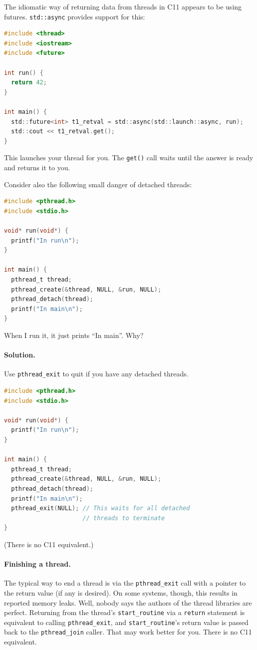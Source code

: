 \documentclass[a4paper]{report}
\newcommand{\CPP}{C\nolinebreak\hspace{-.05em}\raisebox{.4ex}{\tiny\bf +}\nolinebreak\hspace{-.10em}\raisebox{.4ex}{\tiny\bf +}}
\def\CPP{{C\nolinebreak[4]\hspace{-.05em}\raisebox{.4ex}{\tiny\bf ++}}}
\begin{document}
  The idiomatic way of returning data from threads in \CPP11 appears to be using
  futures. {\tt std::async} provides support for this:
\begin{lstlisting}[language=C]
#include <thread>
#include <iostream>
#include <future>

int run() {
  return 42;
}

int main() {
  std::future<int> t1_retval = std::async(std::launch::async, run);
  std::cout << t1_retval.get();
}
\end{lstlisting}
This launches your thread for you. The {\tt get()} call waits until the answer
is ready and returns it to you.

Consider also the following small danger of detached threads:

\begin{lstlisting}[language=C]
#include <pthread.h>
#include <stdio.h>

void* run(void*) {
  printf("In run\n");
}

int main() {
  pthread_t thread;
  pthread_create(&thread, NULL, &run, NULL);
  pthread_detach(thread);
  printf("In main\n");
}
\end{lstlisting}

  When I run it, it just prints ``In main''. Why?

\paragraph{Solution.} Use {\tt pthread\_exit} to quit if you have any detached threads.
  \begin{lstlisting}[language=C]
#include <pthread.h>
#include <stdio.h>

void* run(void*) {
  printf("In run\n");
}

int main() {
  pthread_t thread;
  pthread_create(&thread, NULL, &run, NULL);
  pthread_detach(thread);
  printf("In main\n");
  pthread_exit(NULL); // This waits for all detached
                      // threads to terminate
}
  \end{lstlisting}
(There is no \CPP11 equivalent.)

\paragraph{Finishing a thread.} The typical way to end a thread is via the \texttt{pthread\_exit} call with a pointer to the return value (if any is desired). On some systems, though, this results in reported memory leaks. Well, nobody says the authors of the thread libraries are perfect. Returning from the thread's {\tt start\_routine} via a \texttt{return} statement is equivalent to calling {\tt pthread\_exit}, and {\tt start\_routine}'s return value is passed back to the {\tt pthread\_join} caller. That may work better for you. There is no \CPP11 equivalent.
\end{document}

